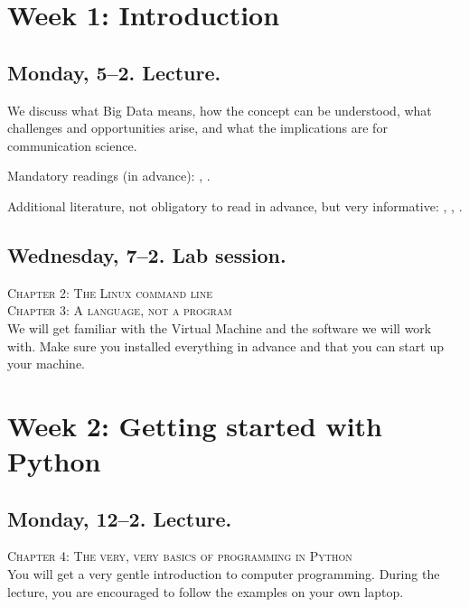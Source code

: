 \documentclass[a4paper,10pt]{report}
\begin{document}
\section*{Week 1: Introduction}
\subsection*{Monday, 5--2. Lecture.}
We discuss what Big Data means, how the concept can be understood, what challenges and opportunities arise, and what the implications are for communication science. 

Mandatory readings (in advance): \citealp{boyd2012}, \citealp{Kitchin2014}. 

Additional literature, not obligatory to read in advance, but very informative: \citealp{Mahrt2013}, \citealp{Vis2013}, \citealp{Trilling2017a}.



\subsection*{Wednesday, 7--2. Lab session.}
\textsc{ Chapter 2: The Linux command line}\\
\textsc{ Chapter 3: A language, not a program}\\

We will get familiar with the Virtual Machine and the software we will work with. Make sure you installed everything in advance and that you can start up your machine. 





\section*{Week 2: Getting started with Python}

\subsection*{Monday, 12--2. Lecture.}
\textsc{ Chapter 4: The very, very basics of programming in Python}\\
You will get a very gentle introduction to computer programming. During the lecture, you are encouraged to follow the examples on your own laptop.
\end{document}
